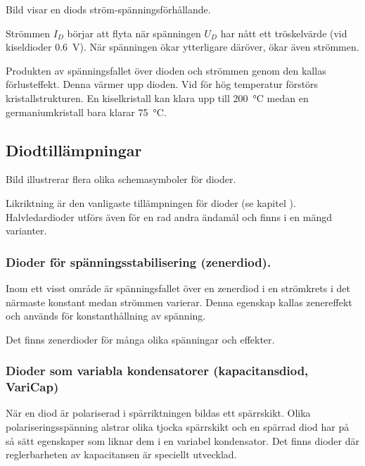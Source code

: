 Bild  visar en diods ström-spänningsförhållande.

Strömmen \(I_D\) börjar att flyta när spänningen \(U_D\) har nått ett
tröskelvärde (vid kiseldioder \qty{0,6}{\volt}).
När spänningen ökar ytterligare däröver, ökar även strömmen.

Produkten av spänningsfallet över dioden och strömmen genom den kallas
förlusteffekt. Denna värmer upp dioden. Vid för hög temperatur förstörs
kristallstrukturen.
En kiselkristall kan klara upp till \qty{200}{\degreeCelsius} medan en
germaniumkristall bara klarar \qty{75}{\degreeCelsius}.


\newpage
\subsection{Diodtillämpningar}

Bild  illustrerar flera olika schemasymboler för
dioder.


Likriktning är den vanligaste tillämpningen för dioder (se kapitel ).
Halvledardioder utförs även för en rad andra ändamål och finns i en mängd
varianter.

\subsubsection{Dioder för spänningsstabilisering (zenerdiod).}
\label{diod_zener}

  Inom ett visst område är spänningsfallet över en zenerdiod i en strömkrets
  i det närmaste konstant medan strömmen varierar. Denna egenskap kallas
  zenereffekt och används för konstanthållning av spänning.

  Det finns zenerdioder för många olika spänningar och effekter.

\subsubsection{Dioder som variabla kondensatorer (kapacitansdiod, VariCap)}
\label{varicap}

  När en diod är polariserad i spärriktningen bildas ett spärrskikt.
  Olika polariseringsspänning alstrar olika tjocka spärrskikt och en spärrad diod
  har på så sätt egenskaper som liknar dem i en variabel kondensator. Det finns
  dioder där reglerbarheten av kapacitansen är speciellt utvecklad.

